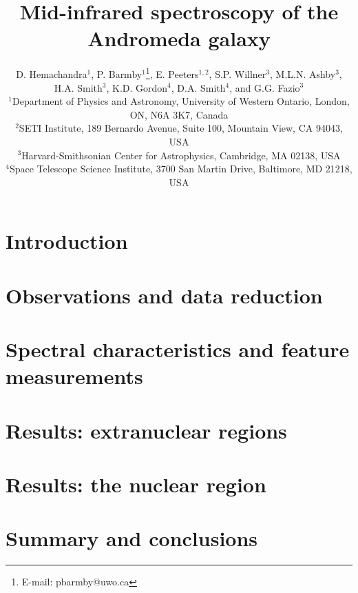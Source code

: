 \documentclass[useAMS,usenatbib,a4paper]{mn2e}
\title[Mid-infrared spectroscopy of M31]{Mid-infrared spectroscopy of the Andromeda galaxy}
\author[D. Hemachandra et al.]
{D. Hemachandra$^{1}$,
P. Barmby$^{1}$\thanks{E-mail: pbarmby@uwo.ca}, 
E. Peeters$^{1,2}$, 
S.P. Willner$^{3}$, 
M.L.N. Ashby$^{3}$,
H.A. Smith$^{3}$, 
\newauthor 
K.D. Gordon$^{4}$,
D.A. Smith$^{4}$,
and
G.G. Fazio$^{3}$\\
$^{1}$Department of Physics and Astronomy, University of Western Ontario, London, ON, N6A 3K7, Canada\\
$^{2}$SETI Institute, 189 Bernardo Avenue, Suite 100, Mountain View, CA 94043, USA\\
$^{3}$Harvard-Smithsonian Center for Astrophysics, Cambridge, MA 02138, USA\\
$^{4}$Space Telescope Science Institute, 3700 San Martin Drive, Baltimore, MD 21218, USA
}
\begin{document}
\date{}

\maketitle

\label{firstpage}



\section{Introduction}



\section{Observations and data reduction}



\section{Spectral characteristics and feature measurements}
\label{sect:data_analysis}



\section{Results: extranuclear regions}



\section{Results: the nuclear region}



\section{Summary and conclusions}
\label{sect:summary}


\end{document}
